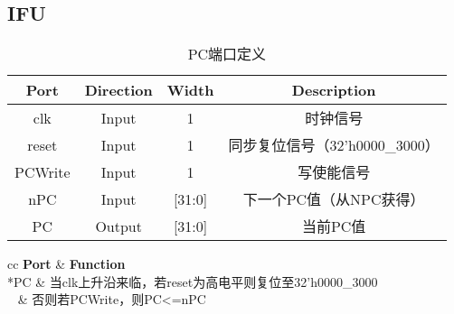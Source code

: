 \documentclass[UTF8]{ctexart}
\begin{document}
\subsection{IFU}
\begin{table}[H]
	\centering
	\begin{threeparttable}
		\caption{PC端口定义}
		\begin{tabular}{cccc}
			\toprule
			\rowcolor{mypink}
			\textbf{Port} & \textbf{Direction} & \textbf{Width} & \textbf{Description}           \\
			\midrule
			clk           & Input              & 1              & 时钟信号                       \\
			\midrule
			reset         & Input              & 1              & 同步复位信号（32'h0000\_3000） \\
			\midrule
			PCWrite       & Input              & 1              & 写使能信号                     \\
			\midrule
			nPC           & Input              & [31:0]         & 下一个PC值（从NPC获得）        \\
			\midrule
			PC            & Output             & [31:0]         & 当前PC值                       \\
			\midrule
		\end{tabular}
	\end{threeparttable}
\end{table}
\begin{table}[H]
	\centering
	\begin{threeparttable}
		\caption{PC功能定义}
		\begin{tabular}{cc}
			\toprule
			\rowcolor{mypink}
			\textbf{Port}     & \textbf{Function}                                      \\
			\midrule
			*{PC} & 当clk上升沿来临，若reset为高电平则复位至32'h0000\_3000 \\
			~                 & 否则若PCWrite，则PC<=nPC                                            \\
			\midrule
		\end{tabular}
	\end{threeparttable}
\end{table}
\end{document}
